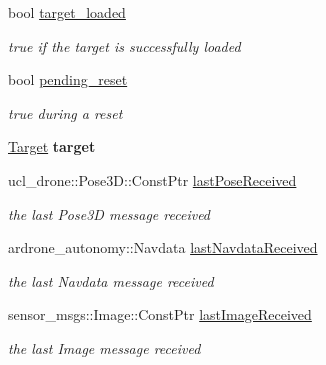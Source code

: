 \begin{DoxyCompactItemize}
\mbox{\label{classImageProcessor_a866a6bc9818ecd3467d82a7fa8c5a257}} 
bool \hyperlink{classImageProcessor_a866a6bc9818ecd3467d82a7fa8c5a257}{target\+\_\+loaded}
\begin{DoxyCompactList}\small\item\em true if the target is successfully loaded \end{DoxyCompactList}\item 
\mbox{\label{classImageProcessor_a4dd5e2fe72ce2245e63e05e4ff2808c9}} 
bool \hyperlink{classImageProcessor_a4dd5e2fe72ce2245e63e05e4ff2808c9}{pending\+\_\+reset}
\begin{DoxyCompactList}\small\item\em true during a reset \end{DoxyCompactList}\item 
\mbox{\label{classImageProcessor_a160e890a82a045904f3866f5656a9ce9}} 
\hyperlink{classTarget}{Target} {\bfseries target}
\item 
\mbox{\label{classImageProcessor_a4475f48beeb11082aa74723997ef3fee}} 
ucl\+\_\+drone\+::\+Pose3\+D\+::\+Const\+Ptr \hyperlink{classImageProcessor_a4475f48beeb11082aa74723997ef3fee}{last\+Pose\+Received}
\begin{DoxyCompactList}\small\item\em the last Pose3D message received \end{DoxyCompactList}\item 
\mbox{\label{classImageProcessor_a8c528573983c6cadf259e7d5ac466f09}} 
ardrone\+\_\+autonomy\+::\+Navdata \hyperlink{classImageProcessor_a8c528573983c6cadf259e7d5ac466f09}{last\+Navdata\+Received}
\begin{DoxyCompactList}\small\item\em the last Navdata message received \end{DoxyCompactList}\item 
\mbox{\label{classImageProcessor_a55878a7516f24609d569e3d96147b407}} 
sensor\+\_\+msgs\+::\+Image\+::\+Const\+Ptr \hyperlink{classImageProcessor_a55878a7516f24609d569e3d96147b407}{last\+Image\+Received}
\begin{DoxyCompactList}\small\item\em the last Image message received \end{DoxyCompactList}\end{DoxyCompactItemize}


